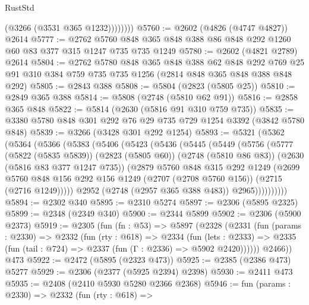 \begin{lexlean}{RustStd}
\begin{coremodule}
                (@3266 (@3531 @365 @1232))))))))
@5760 := @2602 (@4826 (@4747 @4827)) @2614
@5777 := @2762 @5760 @848 @365 @848 @388 @86 @848 @292 @1260 @60 @83 @377 @315 @1247 @735 @735 @1249
@5780 := @2602 (@4821 @2789) @2614
@5804 := @2762
    @5780
    @848
    @365
    @848
    @388
    @62
    @848
    @292
    @769
    @25
    @91
    @310
    @384
    @759
    @735
    @735
    @1256
    (@2814 @848 @365 @848 @388 @848 @292)
@5805 := @2843 @388
@5808 := @5804 (@2823 (@5805 @25))
@5810 := @2849 @365 @388
@5814 := @5808 (@2748 (@5810 @62 @91))
@5816 := @2858 @365 @848
@5822 := @5814 (@2630 (@5816 @91 @310 @759 @735))
@5835 := @3380 @5780 @848 @301 @292 @76 @29 @735 @729 @1254 @3392 (@3842 @5780 @848)
@5839 := @3266 (@3428 @301 @292 @1254)
@5893 := @5321
    (@5362
      (@5364
        (@5366
          (@5383
            (@5406
              (@5423
                (@5436
                  (@5445
                    (@5449
                      (@5756
                        (@5777
                          (@5822 (@5835 @5839))
                          (@2823 (@5805 @60))
                          (@2748 (@5810 @86 @83))
                          (@2630 (@5816 @83 @377 @1247 @735))
                          (@2879
                            @5760
                            @848
                            @315
                            @292
                            @1249
                            (@2699
                              @5760
                              @848
                              @156
                              @292
                              @156
                              @1249
                              (@2707 (@2708 @5760 @156))
                              (@2715 (@2716 @1249)))))
                        @2952
                        (@2748 (@2957 @365 @388 @483))
                        @2965))))))))))
@5894 := @2302 @340
@5895 := @2310 @5274
@5897 := @2306 (@5895 @2325)
@5899 := @2348 (@2349 @340)
@5900 := @2344 @5899
@5902 := @2306 (@5900 @2373)
@5919 := @2305
    (fun (fn : @53) =>
    @5897
      (@2328
        (@2331
          (fun (params : @2330) =>
          @2332
            (fun (rty : @618) =>
            @2334
              (fun (lets : @2333) =>
              @2335 (fun (tail : @724) => @2337 (fun (Γ : @2336) => @5902 @2420))))))
        @2466))
    @473
@5922 := @2472 (@5895 (@2323 @473))
@5925 := @2385 (@2386 @473) @5277
@5929 := @2306 (@2377 (@5925 @2394) @2398)
@5930 := @2411 @473
@5935 := @2408 (@2410 @5930 @5280 @2366 @2368)
@5946 := fun (params : @2330) =>
  @2332
    (fun (rty : @618) =>

\end{coremodule}
\end{lexlean}
